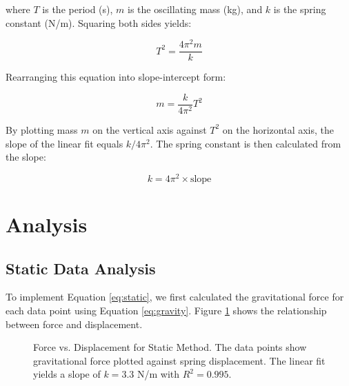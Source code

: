 \documentclass[12pt]{article}
\begin{document}
where $T$ is the period (s), $m$ is the oscillating mass (kg), and $k$ is the spring constant (N/m). Squaring both sides yields:

\begin{equation}
T^2 = \frac{4\pi^2 m}{k}
\label{eq:period_squared}
\end{equation}

Rearranging this equation into slope-intercept form:

\begin{equation}
m = \frac{k}{4\pi^2} T^2
\label{eq:dynamic}
\end{equation}

By plotting mass $m$ on the vertical axis against $T^2$ on the horizontal axis, the slope of the linear fit equals $k/4\pi^2$. The spring constant is then calculated from the slope:

\begin{equation}
k = 4\pi^2 \times \text{slope}
\label{eq:k_dynamic}
\end{equation}

\section*{Analysis}

\subsection*{Static Data Analysis}

To implement Equation \ref{eq:static}, we first calculated the gravitational force for each data point using Equation \ref{eq:gravity}. Figure \ref{fig:static} shows the relationship between force and displacement.

\begin{figure}[H]
\centering
{}
\caption{Force vs. Displacement for Static Method. The data points show gravitational force plotted against spring displacement. The linear fit yields a slope of $k = 3.3$ N/m with $R^2 = 0.995$.}
\label{fig:static}
\end{figure}
\end{document}
